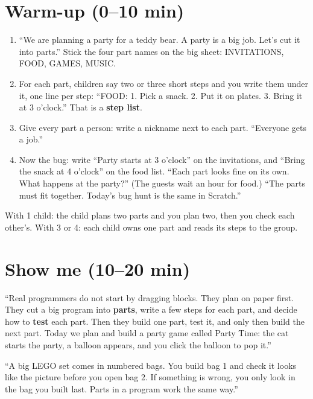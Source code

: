 \section{Warm-up (0--10 min)}
\begin{unplugged}
\begin{enumerate}[leftmargin=1.4em,itemsep=1pt]
  \item \enquote{We are planning a party for a teddy bear. A party is a big job. Let's cut it into parts.} Stick the four part names on the big sheet: INVITATIONS, FOOD, GAMES, MUSIC.
  \item For each part, children say two or three short steps and you write them under it, one line per step: \enquote{FOOD: 1. Pick a snack. 2. Put it on plates. 3. Bring it at 3 o'clock.} That is a \textbf{step list}.
  \item Give every part a person: write a nickname next to each part. \enquote{Everyone gets a job.}
  \item Now the bug: write \enquote{Party starts at 3 o'clock} on the invitations, and \enquote{Bring the snack at 4 o'clock} on the food list. \enquote{Each part looks fine on its own. What happens at the party?} (The guests wait an hour for food.) \enquote{The parts must fit together. Today's bug hunt is the same in Scratch.}
\end{enumerate}
With 1 child: the child plans two parts and you plan two, then you check each other's. With 3 or 4: each child owns one part and reads its steps to the group.
\end{unplugged}

\section{Show me (10--20 min)}
\begin{teacherscript}
\enquote{Real programmers do not start by dragging blocks. They plan on paper first. They cut a big program into \textbf{parts}, write a few steps for each part, and decide how to \textbf{test} each part. Then they build one part, test it, and only then build the next part. Today we plan and build a party game called Party Time: the cat starts the party, a balloon appears, and you click the balloon to pop it.}
\end{teacherscript}

\begin{analogy}
\enquote{A big LEGO set comes in numbered bags. You build bag 1 and check it looks like the picture before you open bag 2. If something is wrong, you only look in the bag you built last. Parts in a program work the same way.}
\end{analogy}

